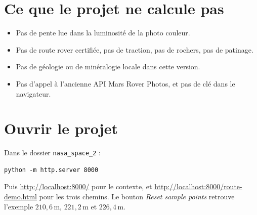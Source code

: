 \documentclass[11pt,a4paper]{article}
\begin{document}
\section{Ce que le projet ne calcule pas}

\begin{itemize}
\item Pas de pente lue dans la luminosité de la photo couleur.
\item Pas de route rover certifiée, pas de traction, pas de rochers, pas de patinage.
\item Pas de géologie ou de minéralogie locale dans cette version.
\item Pas d'appel à l'ancienne API Mars Rover Photos, et pas de clé dans le navigateur.
\end{itemize}

\section{Ouvrir le projet}

Dans le dossier \texttt{nasa\_space\_2} :
\begin{verbatim}
python -m http.server 8000
\end{verbatim}
Puis \url{http://localhost:8000/} pour le contexte, et
\url{http://localhost:8000/route-demo.html} pour les trois chemins.
Le bouton \emph{Reset sample points} retrouve l'exemple
\(210{,}6\,\mathrm{m}\), \(221{,}2\,\mathrm{m}\) et \(226{,}4\,\mathrm{m}\).
\end{document}
